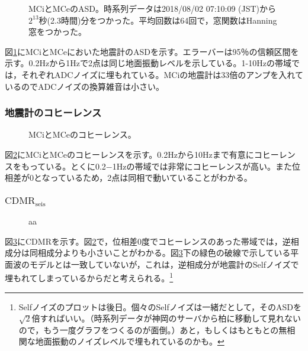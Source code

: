 \begin{figure}[H]
  \begin{center}
  \end{center}
  \caption{MCiとMCeのASD。時系列データは2018/08/02 07:10:09 (JST)から$2^{13}$秒(2.3時間)分をつかった。平均回数は64回で，窓関数はHanning窓をつかった。}\label{img:img_asd_imc}
\end{figure}

図\ref{img:img_asd_imc}にMCiとMCeにおいた地震計のASDを示す。エラーバーは95％の信頼区間を示す。0.2Hzから1Hzで2点は同じ地面振動レベルを示している。1-10Hzの帯域では，それぞれADCノイズに埋もれている。MCiの地震計は33倍のアンプを入れているのでADCノイズの換算雑音は小さい。


\subsubsection{地震計のコヒーレンス}

\begin{figure}[H]
  \begin{center}
  \end{center}
  \caption{MCiとMCeのコヒーレンス。}\label{img:img_coherence_imc}
\end{figure}

図\ref{img:img_coherence_imc}にMCiとMCeのコヒーレンスを示す。0.2Hzから10Hzまで有意にコヒーレンスをもっている。とくに0.2−1Hzの帯域では非常にコヒーレンスが高い。また位相差が0となっているため，2点は同相で動いていることがわかる。



\subsubsection{$\mathrm{CDMR_{seis}}$}
\begin{figure}[H]
  \begin{center}
  \end{center}
  \caption{aa}\label{img:img_cdmr_imc}
\end{figure}
図\ref{img:img_cdmr_imc}にCDMRを示す。図\ref{img:img_coherence_imc}で，位相差0度でコヒーレンスのあった帯域では，逆相成分は同相成分よりも小さいことがわかる。図\ref{img:img_cdmr_imc}下の緑色の破線で示している平面波のモデルとは一致していないが，これは，逆相成分が地震計のSelfノイズで埋もれてしまっているからだと考えられる。\footnote[12]{Selfノイズのプロットは後日。個々のSelfノイズは一緒だとして，そのASDを$\sqrt{2}$倍すればいい。（時系列データが神岡のサーバから柏に移動して見れないので，もう一度グラフをつくるのが面倒。）あと，もしくはもともとの無相関な地面振動のノイズレベルで埋もれているのかも。}






